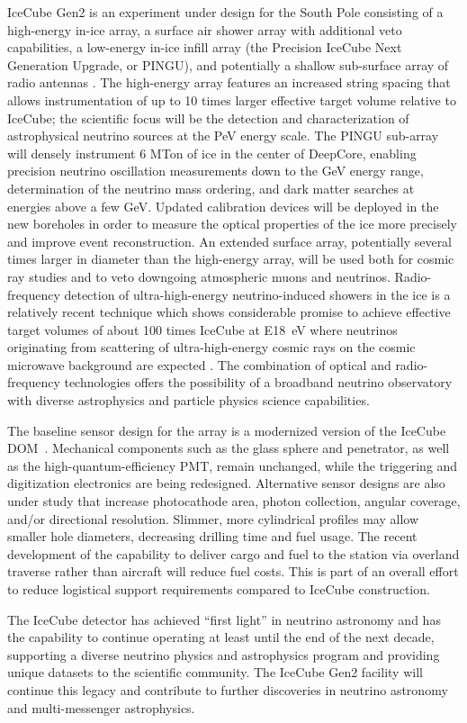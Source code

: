 IceCube Gen2 is an experiment under design for the South Pole
consisting of a high-energy in-ice array, a surface air shower array with
additional veto capabilities, a low-energy in-ice infill array (the Precision IceCube Next
Generation Upgrade, or PINGU), and potentially a shallow sub-surface 
array of radio antennas \cite{gen2_whitepaper}.  The high-energy array features an 
increased string spacing that allows instrumentation of up to 10 times larger 
effective target volume relative to IceCube; the scientific focus will be the
detection and characterization of astrophysical neutrino sources at the PeV
energy scale.  The PINGU sub-array \cite{pingu_loi} will densely instrument
6 MTon of ice in the center of DeepCore, enabling precision neutrino
oscillation measurements down to the GeV energy range, determination of the
neutrino mass ordering, and dark matter searches at energies above a
few GeV.  Updated calibration devices will be deployed in the new
boreholes in order to measure the optical
properties of the ice more precisely and improve event reconstruction. An extended surface
array, potentially several times larger in diameter than the high-energy
array, will be used both for cosmic ray studies and to veto downgoing
atmospheric muons and neutrinos.  Radio-frequency detection of ultra-high-energy
neutrino-induced showers in the ice is a relatively recent
technique which shows considerable promise to achieve effective
target volumes of about 100 times IceCube at \qty{E18}{eV} where neutrinos
originating from scattering of ultra-high-energy cosmic rays on the 
cosmic microwave background are expected \cite{ara2}.  The 
combination of optical and radio-frequency technologies offers the possibility
of a broadband neutrino observatory with diverse astrophysics and particle
physics science capabilities. 

The baseline sensor design for the array is a modernized version of the
IceCube DOM~\cite{pingu_loi}.  Mechanical components such as the glass sphere and
penetrator, as well as the high-quantum-efficiency PMT, remain unchanged,
while the triggering and digitization electronics are being redesigned.
Alternative sensor designs are also under study that increase photocathode
area, photon collection, angular coverage, and/or directional resolution.
Slimmer, more cylindrical profiles may 
allow smaller hole diameters, decreasing drilling time and fuel usage.
The recent development of the capability to deliver cargo and fuel to the
station via overland traverse rather than aircraft will reduce fuel
costs. This 
is part of an overall effort to reduce logistical support requirements
compared to IceCube construction.  

The IceCube detector has achieved ``first light'' in neutrino astronomy and
has the capability to continue operating at least until the end of the next decade, supporting 
a diverse neutrino physics and astrophysics program and providing unique datasets
to the scientific community.  The IceCube Gen2 facility will continue this legacy 
and contribute to further discoveries in neutrino astronomy and multi-messenger astrophysics.

